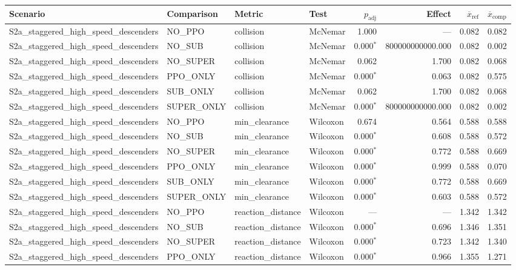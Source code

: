 \begin{tabular}{llllrrrl}
\toprule
Scenario & Comparison & Metric & Test & $p_\mathrm{adj}$ & Effect & $\overline{x}_\mathrm{ref}$ & $\overline{x}_\mathrm{comp}$ \\
\midrule
  S2a_staggered_high_speed_descenders & NO_PPO & collision & McNemar & 1.000 & --- & 0.082 & 0.082 \\
  S2a_staggered_high_speed_descenders & NO_SUB & collision & McNemar & 0.000$^{*}$ & 800000000000.000 & 0.082 & 0.002 \\
  S2a_staggered_high_speed_descenders & NO_SUPER & collision & McNemar & 0.062 & 1.700 & 0.082 & 0.068 \\
  S2a_staggered_high_speed_descenders & PPO_ONLY & collision & McNemar & 0.000$^{*}$ & 0.063 & 0.082 & 0.575 \\
  S2a_staggered_high_speed_descenders & SUB_ONLY & collision & McNemar & 0.062 & 1.700 & 0.082 & 0.068 \\
  S2a_staggered_high_speed_descenders & SUPER_ONLY & collision & McNemar & 0.000$^{*}$ & 800000000000.000 & 0.082 & 0.002 \\
  S2a_staggered_high_speed_descenders & NO_PPO & min_clearance & Wilcoxon & 0.674 & 0.564 & 0.588 & 0.588 \\
  S2a_staggered_high_speed_descenders & NO_SUB & min_clearance & Wilcoxon & 0.000$^{*}$ & 0.608 & 0.588 & 0.572 \\
  S2a_staggered_high_speed_descenders & NO_SUPER & min_clearance & Wilcoxon & 0.000$^{*}$ & 0.772 & 0.588 & 0.669 \\
  S2a_staggered_high_speed_descenders & PPO_ONLY & min_clearance & Wilcoxon & 0.000$^{*}$ & 0.999 & 0.588 & 0.070 \\
  S2a_staggered_high_speed_descenders & SUB_ONLY & min_clearance & Wilcoxon & 0.000$^{*}$ & 0.772 & 0.588 & 0.669 \\
  S2a_staggered_high_speed_descenders & SUPER_ONLY & min_clearance & Wilcoxon & 0.000$^{*}$ & 0.603 & 0.588 & 0.572 \\
  S2a_staggered_high_speed_descenders & NO_PPO & reaction_distance & Wilcoxon & --- & --- & 1.342 & 1.342 \\
  S2a_staggered_high_speed_descenders & NO_SUB & reaction_distance & Wilcoxon & 0.000$^{*}$ & 0.696 & 1.346 & 1.351 \\
  S2a_staggered_high_speed_descenders & NO_SUPER & reaction_distance & Wilcoxon & 0.000$^{*}$ & 0.723 & 1.342 & 1.340 \\
  S2a_staggered_high_speed_descenders & PPO_ONLY & reaction_distance & Wilcoxon & 0.000$^{*}$ & 0.966 & 1.355 & 1.271 \\

\end{tabular}
